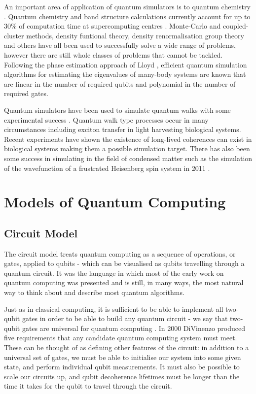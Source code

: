 An important area of application of quantum simulators is to quantum chemistry \cite{science_quantum_simulator_review_09}. Quantum chemistry and band structure calculations currently account for up to 30\% of computation time at supercomputing centres \cite{simulation_photon_review, supercomputer_report_10}. Monte-Carlo and coupled-cluster methods, density funtional theory, density renormalisation group theory and others have all been used to successfully solve a wide range of problems, however there are still whole classes of problems that cannot be tackled. Following the phase estimation approach of Lloyd \cite{lloyd_simulate_eigenvalues_99, lloyd_simulate_many_body_97}, efficient quantum simulation algorithms for estimating the eigenvalues of many-body systems are known \cite{quantum_chem_alg_05, simulation_hamiltonians_11} that are linear in the number of required qubits and polynomial in the number of required gates. 

Quantum simulators have been used to simulate quantum walks \cite{farhi_quantum_walks_98} with some experimental success \cite{quantum_walks_simulated_08}. Quantum walk type processes occur in many circumstances including exciton transfer in light harvesting biological systems. Recent experiments have shown the existence of long-lived coherences can exist in biological systems \cite{quant_bio_coherences_1, quant_bio_coherences_2, quant_bio_coherences_3} making them a possible simulation target. There has also been some success in simulating in the field of condensed matter such as the simulation of the wavefunction of a frustrated Heisenberg spin system in 2011 \cite{simulation_frustrated_spins_11}.

\section{Models of Quantum Computing}

\subsection{Circuit Model}

The circuit model treats quantum computing as a sequence of operations, or gates, applied to qubits - which can be visualised as qubits travelling through a quantum circuit. It was the language in which most of the early work on quantum computing was presented and is still, in many ways, the most natural way to think about and describe most quantum algorithms.

Just as in classical computing, it is sufficient to be able to implement all two-qubit gates in order to be able to build any quantum circuit - we say that two-qubit gates are universal for quantum computing \cite{two_bit_gates_universal}. In 2000 DiVinenzo produced five requirements \cite{divincenzo_requirements} that any candidate quantum computing system must meet. These can be thought of as defining other features of the circuit: in addition to a universal set of gates, we must be able to initialise our system into some given state, and perform individual qubit measurements. It must also be possible to scale our circuits up, and qubit decoherence lifetimes must be longer than the time it takes for the qubit to travel through the circuit.

